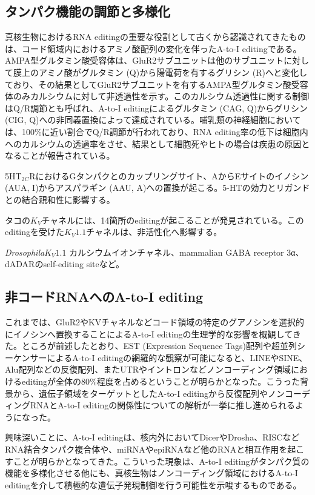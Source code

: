 \subsection{タンパク機能の調節と多様化}
真核生物におけるRNA editingの重要な役割として古くから認識されてきたものは、コード領域内におけるアミノ酸配列の変化を伴ったA-to-I editingである。AMPA型グルタミン酸受容体は、GluR2サブユニットは他のサブユニットに対して膜上のアミノ酸がグルタミン (Q)から陽電荷を有するグリシン (R)へと変化しており、その結果としてGluR2サブユニットを有するAMPA型グルタミン酸受容体のみカルシウムに対して非透過性を示す。このカルシウム透過性に関する制御はQ/R調節とも呼ばれ、A-to-I editingによるグルタミン (CAG, Q)からグリシン (CIG, Q)への非同義置換によって達成されている。哺乳類の神経細胞においては、100\%に近い割合でQ/R調節が行われており、RNA editing率の低下は細胞内へのカルシウムの透過率をさせ、結果として細胞死やヒトの場合は疾患の原因となることが報告されている。
\par
5HT$_{2C}$RにおけるGタンパクとのカップリングサイト、AからEサイトのイノシン (AUA, I)からアスパラギン (AAU, A)への置換が起こる。5-HTの効力とリガンドとの結合親和性に影響する。
\par
タコの$K_{V}$チャネルには、14箇所のeditingが起こることが発見されている。このeditingを受けた$K_{V}1.1$チャネルは、非活性化へ影響する。

\textit{Drosophila}$K_{V}1.1$ カルシウムイオンチャネル、mammalian GABA receptor 3α、 dADARのself-editing siteなど。

\subsection{非コードRNAへのA-to-I editing}
これまでは、GluR2やKVチャネルなどコード領域の特定のグアノシンを選択的にイノシンへ置換することによるA-to-I editingの生理学的な影響を概観してきた。ところが前述したとおり、EST (Expression Sequence Tags)配列や超並列シーケンサーによるA-to-I editingの網羅的な観察が可能になると、LINEやSINE、Alu配列などの反復配列、またUTRやイントロンなどノンコーディング領域におけるeditingが全体の80\%程度を占めるということが明らかとなった。こうった背景から、遺伝子領域をターゲットとしたA-to-I editingから反復配列やノンコーディングRNAとA-to-I editingの関係性についての解析が一挙に推し進められるようになった。
\par
興味深いことに、A-to-I editingは、核内外においてDicerやDrosha、RISCなどRNA結合タンパク複合体や、miRNAやepiRNAなど他のRNAと相互作用を起こすことが明らかとなってきた。こういった現象は、A-to-I editingがタンパク質の機能を多様化させる他にも、真核生物はノンコーディング領域におけるA-to-I editingを介して積極的な遺伝子発現制御を行う可能性を示唆するものである。

